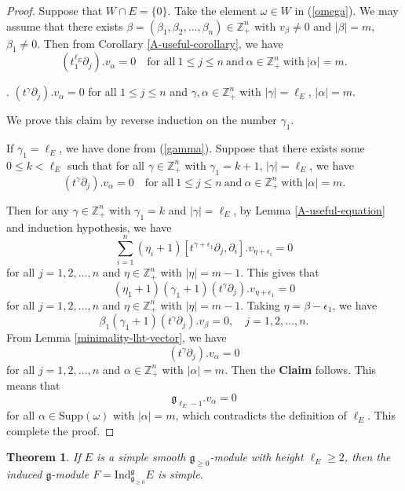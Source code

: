 \documentclass[12pt, a4paper]{amsart}
\newcommand{\fg}{\mathfrak g}
\theoremstyle{Theorem}
\theoremstyle{Theorem}
\newtheorem{theorem}[thm]{Theorem}
\numberwithin{equation}{section}
\begin{document}
\begin{proof}
Suppose that $W\cap E=\{0\}$. Take the element $\omega\in W$ in (\ref{omega}). We may assume that there exists
$\beta=(\beta_1,\beta_2,\ldots,\beta_n)\in\mathbb{Z}_+^n$ with $v_{\beta}\neq0$ and $|\beta|=m$, $\beta_1\neq0$.
Then from Corollary \ref{A-useful-corollary}, we have
\begin{equation}\label{gamma}(t_1^{\ell_E}\partial_j).v_{\alpha}=0\quad \text{for all}\ 1\leq j\leq n\ \text{and}\
\alpha\in\mathbb{Z}_+^n\ \text{with}\ |\alpha|=m.\end{equation}

.
$(t^{\gamma}\partial_j).v_{\alpha}=0$ for all $1\leq j\leq n$ and $\gamma,\alpha\in\mathbb{Z}_+^n$
with $|\gamma|=\ell_E$, $|\alpha|=m$.

We prove this claim by reverse induction on the number $\gamma_1$.
	
If $\gamma_1=\ell_E$, we have done from   (\ref{gamma}). Suppose that there exists some $0\leq k <\ell_E$
such that for all $\gamma\in\mathbb{Z}_+^n$ with $\gamma_1=k + 1$, $|\gamma|=\ell_E$, we have
\[(t^{\gamma}\partial_j).v_{\alpha}=0\quad\text{for all}\ 1\leq j\leq n\ \text{and}\
\alpha\in\mathbb{Z}_+^n\ \text{with}\ |\alpha|=m.\]
	
Then for any $\gamma\in\mathbb{Z}_+^n$ with $\gamma_1=k$ and $|\gamma|=\ell_E$,
by Lemma \ref{A-useful-equation} and induction hypothesis, we have
\[\sum_{i=1}^{n}(\eta_i + 1)[t^{\gamma+\epsilon_1}\partial_j,\partial_i].v_{\eta+\epsilon_i}=0\]
for all $j=1,2,\dots,n$ and $\eta\in\mathbb{Z}_+^n$ with $|\eta|=m-1$. This gives that
\[(\eta_1+1)(\gamma_1+1)(t^{\gamma}\partial_j).v_{\eta+\epsilon_1}=0\]
for all $j=1,2,\dots,n$ and $\eta\in\mathbb{Z}_+^n$ with $|\eta|=m-1$.
Taking $\eta=\beta-\epsilon_1$, we have
\[\beta_1(\gamma_1+1)(t^{\gamma}\partial_j).v_{\beta}=0,\quad j=1,2,\dots,n.\]
From Lemma \ref{minimality-lht-vector}, we have
\[(t^{\gamma}\partial_j).v_{\alpha}=0\]
for all $j=1,2,\dots,n$ and $\alpha\in\mathbb{Z}_+^n$ with $|\alpha|=m$. Then the {\bf Claim} follows. This means that
\[\mathfrak{g}_{\ell_E-1}.v_{\alpha}=0\]
for all $\alpha\in\mathrm{Supp}(\omega)$ with $|\alpha|=m$, which contradicts the definition of $\ell_E$.
This complete the proof.
\end{proof}

\begin{theorem}\label{g_0-induce-module-height-geq2}
If $E$ is a simple smooth $\fg_{\geq0}$-module with height $\ell_{E}\geq2$, then the induced $\fg$-module $F=\mathrm{Ind}_{\fg_{\geq0}}^{\fg}E$ is simple.
\end{theorem}
\end{document}
